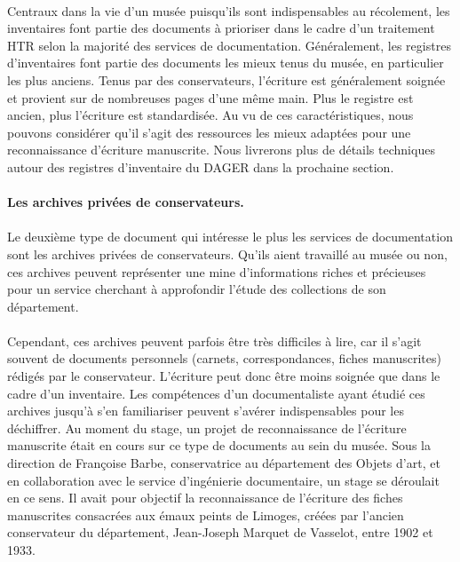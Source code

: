 \documentclass[a4paper,12pt,twoside]{book}
\begin{document}
\paragraph{}
Centraux dans la vie d’un musée puisqu'ils sont indispensables au récolement, les inventaires font partie des documents à prioriser dans le cadre d’un traitement HTR selon la majorité des services de documentation. Généralement, les registres d’inventaires font partie des documents les mieux tenus du musée, en particulier les plus anciens. Tenus par des conservateurs, l’écriture est généralement soignée et provient sur de nombreuses pages d’une même main. Plus le registre est ancien, plus l’écriture est standardisée. Au vu de ces caractéristiques, nous pouvons considérer qu’il s’agit des ressources les mieux adaptées pour une reconnaissance d’écriture manuscrite. Nous livrerons plus de détails techniques autour des registres d’inventaire du DAGER dans la prochaine section. 

\paragraph{Les archives privées de conservateurs.}

\paragraph{}
Le deuxième type de document qui intéresse le plus les services de documentation  sont les archives privées de conservateurs. Qu'ils aient travaillé au musée ou non, ces archives peuvent représenter une mine d'informations riches et précieuses pour un service cherchant à approfondir l'étude des collections de son département.

\paragraph{}
Cependant, ces archives peuvent parfois être très difficiles à lire, car il s'agit souvent de documents personnels (carnets, correspondances, fiches manuscrites) rédigés par le conservateur. L'écriture peut donc être moins soignée que dans le cadre d'un inventaire. Les compétences d'un documentaliste ayant étudié ces archives jusqu'à s'en familiariser peuvent s'avérer indispensables pour les déchiffrer.
Au moment du stage, un projet de reconnaissance de l’écriture manuscrite était en cours sur ce type de documents au sein du musée. Sous la direction de Françoise Barbe, conservatrice au département des Objets d’art, et en collaboration avec le service d’ingénierie documentaire, un stage se déroulait en ce sens. Il avait pour objectif la reconnaissance de l’écriture des fiches manuscrites consacrées aux émaux peints de Limoges, créées par l'ancien conservateur du département, Jean-Joseph Marquet de Vasselot, entre 1902 et 1933.
\end{document}
